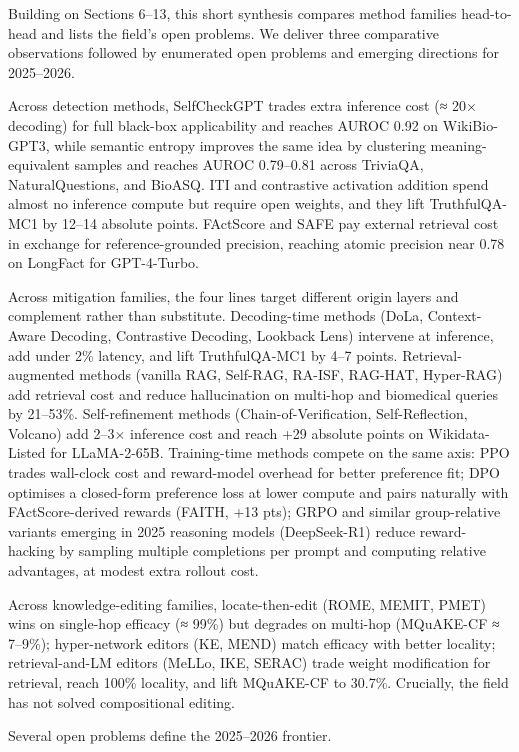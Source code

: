 \documentclass{article}
\begin{document}
Building on Sections 6--13, this short synthesis compares method families head-to-head and lists the field's open problems. We deliver three comparative observations followed by enumerated open problems and emerging directions for 2025--2026.

Across detection methods, SelfCheckGPT trades extra inference cost (≈ 20× decoding) for full black-box applicability and reaches AUROC 0.92 on WikiBio-GPT3, while semantic entropy improves the same idea by clustering meaning-equivalent samples and reaches AUROC 0.79--0.81 across TriviaQA, NaturalQuestions, and BioASQ. ITI and contrastive activation addition spend almost no inference compute but require open weights, and they lift TruthfulQA-MC1 by 12--14 absolute points. FActScore and SAFE pay external retrieval cost in exchange for reference-grounded precision, reaching atomic precision near 0.78 on LongFact for GPT-4-Turbo.

Across mitigation families, the four lines target different origin layers and complement rather than substitute. Decoding-time methods (DoLa, Context-Aware Decoding, Contrastive Decoding, Lookback Lens) intervene at inference, add under 2\% latency, and lift TruthfulQA-MC1 by 4--7 points. Retrieval-augmented methods (vanilla RAG, Self-RAG, RA-ISF, RAG-HAT, Hyper-RAG) add retrieval cost and reduce hallucination on multi-hop and biomedical queries by 21--53\%. Self-refinement methods (Chain-of-Verification, Self-Reflection, Volcano) add 2--3× inference cost and reach +29 absolute points on Wikidata-Listed for LLaMA-2-65B. Training-time methods compete on the same axis: PPO trades wall-clock cost and reward-model overhead for better preference fit; DPO optimises a closed-form preference loss at lower compute and pairs naturally with FActScore-derived rewards (FAITH, +13 pts); GRPO and similar group-relative variants emerging in 2025 reasoning models (DeepSeek-R1) reduce reward-hacking by sampling multiple completions per prompt and computing relative advantages, at modest extra rollout cost.

Across knowledge-editing families, locate-then-edit (ROME, MEMIT, PMET) wins on single-hop efficacy (≈ 99\%) but degrades on multi-hop (MQuAKE-CF ≈ 7--9\%); hyper-network editors (KE, MEND) match efficacy with better locality; retrieval-and-LM editors (MeLLo, IKE, SERAC) trade weight modification for retrieval, reach 100\% locality, and lift MQuAKE-CF to 30.7\%. Crucially, the field has not solved compositional editing.

Several open problems define the 2025--2026 frontier.
\end{document}
